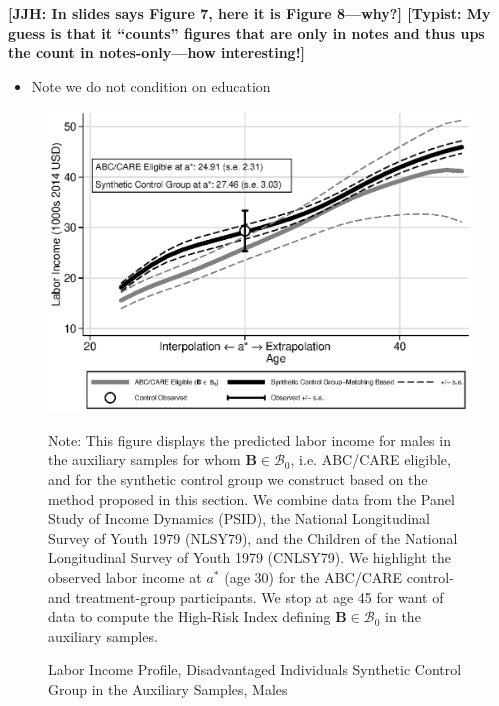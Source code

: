 \documentclass[static]{JJH-Beamer}
\begin{document}
\textbf{[JJH: In slides says Figure 7, here it is Figure 8---why?] [Typist: My guess is that it ``counts'' figures that are only in notes and thus ups the count in notes-only---how interesting!]}

\begin{itemize}
\item Note we do not condition on education
\end{itemize}

\clearpage
\begin{frame}

\begin{figure}[H]
\caption{Labor Income Profile, Disadvantaged Individuals Synthetic Control Group in the Auxiliary Samples, Males}\label{figure:controltests}
\begin{center}
\includegraphics[width=.65\textwidth]{output/abccare_disad_1}
\end{center}
\tiny \flushleft Note: This figure displays the predicted labor income for males in the auxiliary samples for whom $\bm{B} \in \mathcal{B}_0$, i.e. ABC/CARE eligible, and for the synthetic control group we construct based on the method proposed in this section. We combine data from the Panel Study of Income Dynamics (PSID), the National Longitudinal Survey of Youth 1979 (NLSY79), and the Children of the National Longitudinal Survey of Youth 1979 (CNLSY79). We highlight the observed labor income at $a^*$ (age 30) for the ABC/CARE control- and treatment-group participants. We stop at age 45 for want of data to compute the High-Risk Index defining $\bm{B} \in \mathcal{B}_0$ in the auxiliary samples.\\
\end{figure}

\end{frame}
\end{document}
